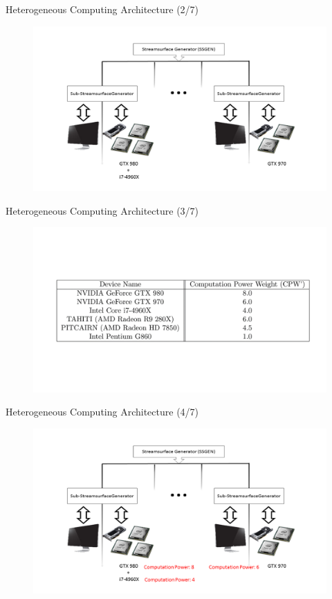 \documentclass{beamer}
\begin{document}
\begin{frame}{Heterogeneous Computing Architecture (2/7)}
	\begin{figure}
		\includegraphics[width=\linewidth]{figures/MAarch2.PNG}
	\end{figure}
\end{frame}

\begin{frame}{Heterogeneous Computing Architecture (3/7)}
	\begin{figure}
		\includegraphics[width=\linewidth]{figures/MAarch3.PNG}
	\end{figure}
\end{frame}

\begin{frame}{Heterogeneous Computing Architecture (4/7)}
	\begin{figure}
		\includegraphics[width=\linewidth]{figures/MAarch4.PNG}
	\end{figure}
\end{frame}
\end{document}
